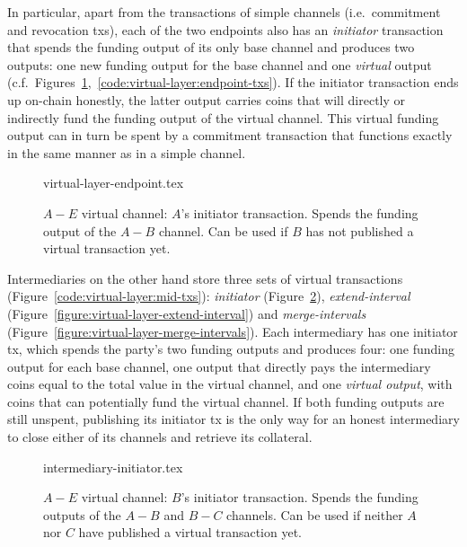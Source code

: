   In particular, apart from the transactions of simple channels (i.e.\
  commitment and revocation txs), each of the two
  endpoints also has an \emph{initiator} transaction that spends the funding output
  of its only base channel and produces two outputs: one new funding output for
  the base channel and one \emph{virtual} output (c.f.\
  Figures~\ref{figure:virtual-layer-endpoint},~\ref{code:virtual-layer:endpoint-txs}).
  If the initiator transaction ends up on-chain honestly, the latter output
  carries coins that will directly or indirectly fund the funding output of the
  virtual channel. This virtual funding output can in turn be spent by a
  commitment transaction that functions exactly in the same manner as in a
  simple channel.

  \begin{figure}
    {virtual-layer-endpoint.tex}
    \caption{$A-E$ virtual channel: $A$'s initiator transaction. Spends the
    funding output of the $A-B$ channel. Can be used if $B$ has not published
    a virtual transaction yet.}
    \label{figure:virtual-layer-endpoint}
  \end{figure}

  Intermediaries on the other hand store three sets of virtual transactions
  (Figure~\ref{code:virtual-layer:mid-txs}): \emph{initiator}
  (Figure~\ref{figure:virtual-layer-initiator}), \emph{extend-interval}
  (Figure~\ref{figure:virtual-layer-extend-interval}) and \emph{merge-intervals}
  (Figure~\ref{figure:virtual-layer-merge-intervals}). Each intermediary has one
  initiator tx, which spends the party's two funding outputs and produces four:
  one funding output for each base channel, one output that directly pays the
  intermediary coins equal to the total value in the virtual channel, and one
  \emph{virtual output}, with coins that can potentially fund the virtual
  channel. If both funding outputs are still unspent, publishing its initiator
  tx is the only way for an honest intermediary to close either of its channels
  and retrieve its collateral.

  \begin{figure}
    {intermediary-initiator.tex}
    \caption{$A-E$ virtual channel: $B$'s initiator transaction. Spends the
    funding outputs of the $A-B$ and $B-C$ channels. Can be used if neither
    $A$ nor $C$ have published a virtual transaction yet.}
    \label{figure:virtual-layer-initiator}
  \end{figure}

